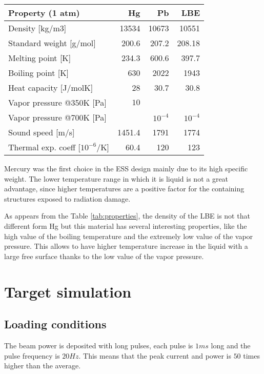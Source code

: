 \documentclass[a4paper, 11pt, twocolumn]{article}
\begin{document}
\begin{table*}
\centering
\begin{tabular}{|l|r|r|r|}
\hline
\textbf{Property (1 atm)} & \textbf{Hg} & \textbf{Pb} & \textbf{LBE} \\
\hline
Density [kg/m3] & 13534 & 10673 & 10551 \\
Standard weight [g/mol] & 200.6 & 207.2 & 208.18 \\
Melting point [K] & 234.3 & 600.6 & 397.7 \\
Boiling point [K] & 630 & 2022 & 1943 \\
Heat capacity [J/molK] & 28 & 30.7 & 30.8 \\
Vapor pressure @350K [Pa] & $10$& & \\
Vapor pressure @700K [Pa] & & $10^{-4}$ & $10^{-4}$ \\
Sound speed [m/s] & 1451.4 & 1791 & 1774 \\
Thermal exp. coeff [$10^{-6}$/K] & 60.4 & 120 & 123\\
\hline
\end{tabular}
\caption{Material properties of some liquid metals.}
\label{tab:properties}
\end{table*}

Mercury was the first choice in the ESS design mainly due to its high specific weight. The lower temperature range in which it is liquid is not a great advantage, since higher temperatures are a positive factor for the containing structures exposed to radiation damage.

As appears from the Table \ref{tab:properties}, the density of the LBE is not that different form Hg but this material has several interesting properties, like the high value of the boiling temperature and the extremely low value of the vapor pressure. This allows to have higher temperature increase in the liquid with a large free surface thanks to the low value of the vapor pressure.

\section{Target simulation}

\subsection{Loading conditions}
The beam power is deposited with long pulses, each pulse is $1ms$ long and the pulse frequency is $20Hz$. This means that the peak current and power is $50$ times higher than the average.
\end{document}
